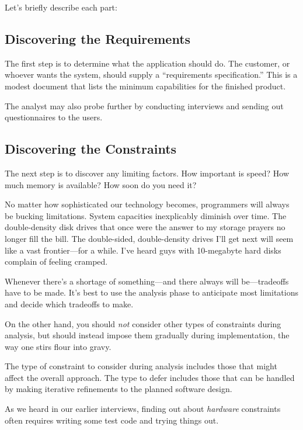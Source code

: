 \noindent Let's briefly describe each part:

\subsection{Discovering the Requirements}%
%

The first step is to determine what the application should do. The
customer, or whoever wants the system, should supply a ``requirements
specification.'' This is a modest document that lists the minimum
capabilities for the finished product.

The analyst may also probe further by conducting interviews and
sending out questionnaires to the users.%
%

\subsection{Discovering the Constraints}%
%

The next step is to discover any limiting factors. How important is
speed? How much memory is available? How soon do you need it?

No matter how sophisticated our technology becomes, programmers will
always be bucking limitations. System capacities inexplicably
diminish over time. The double-density disk drives that once were the
answer to my storage prayers no longer fill the bill. The
double-sided, double-density drives I'll get next will seem like a
vast frontier---for a while. I've heard guys with 10-megabyte hard
disks complain of feeling cramped.

Whenever there's a shortage of something---and there always will
be---tradeoffs have to be made. It's best to use the analysis phase to
anticipate most limitations and decide which tradeoffs to make.

On the other hand, you should \emph{not} consider other types of
constraints during analysis, but should instead impose them gradually
during implementation, the way one stirs flour into gravy.

The type of constraint to consider during analysis includes those that
might affect the overall approach. The type to defer includes those
that can be handled by making iterative refinements to the planned
software design.

As we heard in our earlier interviews, finding out about \emph{hardware}
constraints often requires writing
some test code and trying things out.


